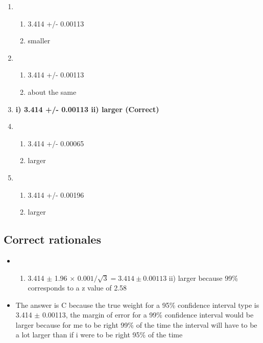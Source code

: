 \documentclass[letterpaper,12pt,twoside,printwatermark=false]{pinp}
\providecommand{\tightlist}{%
  \setlength{\itemsep}{0pt}\setlength{\parskip}{0pt}}
\begin{document}
\begin{enumerate}
\def\labelenumi{\alph{enumi}.}
\item
  \begin{enumerate}
  \def\labelenumii{\roman{enumii})}
  \tightlist
  \item
    3.414 +/- 0.00113
  \item
    smaller
  \end{enumerate}
\item
  \begin{enumerate}
  \def\labelenumii{\roman{enumii})}
  \tightlist
  \item
    3.414 +/- 0.00113
  \item
    about the same
  \end{enumerate}
\item
  \textbf{i) 3.414 +/- 0.00113 ii) larger (Correct)}
\item
  \begin{enumerate}
  \def\labelenumii{\roman{enumii})}
  \tightlist
  \item
    3.414 +/- 0.00065
  \item
    larger
  \end{enumerate}
\item
  \begin{enumerate}
  \def\labelenumii{\roman{enumii})}
  \tightlist
  \item
    3.414 +/- 0.00196
  \item
    larger
  \end{enumerate}
\end{enumerate}

\hypertarget{correct-rationales-3}{%
\subsection{Correct rationales}\label{correct-rationales-3}}

\begin{itemize}
\item
  \begin{enumerate}
  \def\labelenumi{\roman{enumi})}
  \tightlist
  \item
    3.414 \(\pm\) 1.96 \(\times\) \(0.001/\sqrt{3} = 3.414 \pm 0.00113\)
    ii) larger because 99\% corresponds to a z value of 2.58
  \end{enumerate}
\item
  The answer is C because the true weight for a 95\% confidence interval
  type is 3.414 \(\pm\) 0.00113, the margin of error for a 99\%
  confidence interval would be larger because for me to be right 99\% of
  the time the interval will have to be a lot larger than if i were to
  be right 95\% of the time
\end{itemize}
\end{document}
